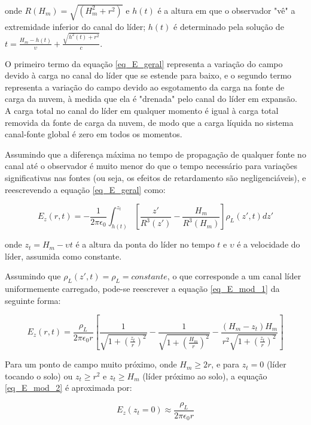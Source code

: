\documentclass[a4paper, 12pt, onecolumn,singlespacing]{article}
\begin{document}
	onde $R(H_m) = \sqrt{(H_m^2 + r^2)}$  e $h(t)$ é a altura em que o observador "vê" a extremidade inferior do canal do líder; $h(t)$ é determinado pela solução de $t = \frac{H_m - h(t)}{\upsilon} + \frac{\sqrt{h^2(t) + r^2}}{c}$.
	
	O primeiro termo da equação \ref{eq_E_geral} representa a variação do campo devido à carga no canal do líder que se estende para baixo, e o segundo termo representa a variação do campo devido ao esgotamento da carga na fonte de carga da nuvem, à medida que ela é "drenada" pelo canal do líder em expansão. A carga total no canal do líder em qualquer momento é igual à carga total removida da fonte de carga da nuvem, de modo que a carga líquida no sistema canal-fonte global é zero em todos os momentos.
	
	Assumindo que a diferença máxima no tempo de propagação de qualquer fonte no canal até o observador é muito menor do que o tempo necessário para variações significativas nas fontes (ou seja, os efeitos de retardamento são negligenciáveis), e reescrevendo a equação \ref{eq_E_geral} como:
	
	\begin{equation}
		E_z(r, t) = -\frac{1}{2 \pi \epsilon_0} \int_{h(t)}^{z_t} \left[\frac{z'}{R^3(z')} - \frac{H_m}{R^3(H_m)}\right] \rho_L(z', t) dz'
		\label{eq_E_mod_1}
	\end{equation}
	
	onde $z_t = H_m - \upsilon t$ é a altura da ponta do líder no tempo $t$ e $\upsilon$ é a velocidade do líder, assumida como constante.
	
	Assumindo que $\rho_L (z', t) = \rho_L = constante$, o que corresponde a um canal líder uniformemente carregado, pode-se reescrever a equação \ref{eq_E_mod_1} da seguinte forma:
	
	\begin{equation}
		E_z(r,t) = \frac{\rho_L}{2 \pi \epsilon_0 r} \left[\frac{1}{\sqrt{1 + \left(\frac{z_t}{r}\right) ^2}} - \frac{1}{\sqrt{1 + \left(\frac{H_m}{r}\right) ^2}} - \frac{\left(H_m - z_t\right) H_m}{r^2\sqrt{1 + \left(\frac{z_t}{r}\right) ^2}}\right]
		\label{eq_E_mod_2}
	\end{equation}
	
	Para um ponto de campo muito próximo, onde $H_m \geq 2r$, e para $z_t = 0$ (líder tocando o solo) ou $z_t \geq r^2$ e $z_t \geq H_m$ (líder próximo ao solo), a equação \ref{eq_E_mod_2} é aproximada por:
	
	\begin{equation}
		E_z(z_t = 0) \approx \frac{\rho_L}{2 \pi \epsilon_0 r}
		\label{eq_E_mod_3}
	\end{equation}
	
\end{document}
